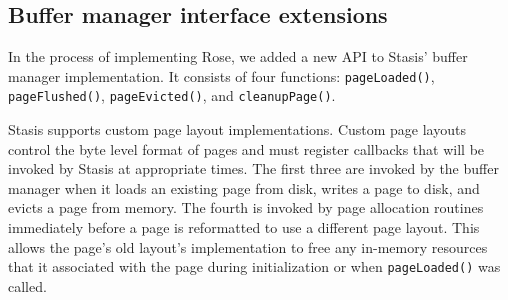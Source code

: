\documentclass{vldb}
\newcommand{\rows}{Rose\xspace}
\newcommand{\rowss}{Rose's\xspace}
\begin{document}




\subsection{Buffer manager interface extensions}

In the process of implementing \rows, we added a new API to
Stasis' buffer manager implementation.  It consists of four
functions: {\tt pageLoaded()}, {\tt pageFlushed()}, {\tt pageEvicted()},
and {\tt cleanupPage()}.

Stasis supports custom page layout implementations.  Custom page
layouts control the byte level format of pages and must register
callbacks that will be invoked by Stasis at appropriate times.  The
first three are invoked by the buffer manager when it loads an
existing page from disk, writes a page to disk, and evicts a page
from memory.  The fourth is invoked by page allocation
routines immediately before a page is reformatted to use a different
page layout.  This allows the page's old layout's implementation to
free any in-memory resources that it associated with the page during
initialization or when {\tt pageLoaded()} was called.
\end{document}
